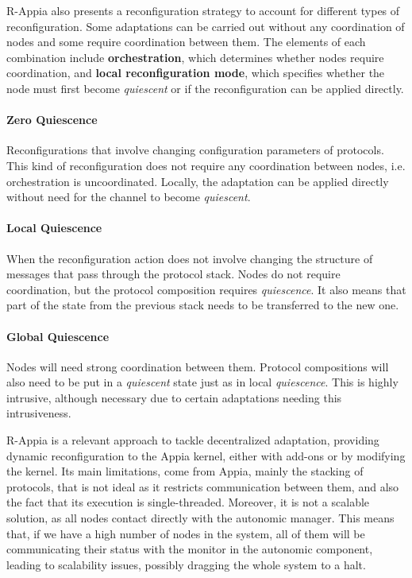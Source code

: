 R-Appia also presents a reconfiguration strategy to account for different types of reconfiguration. Some adaptations can be carried out  without any coordination of nodes and some require coordination between them. The elements of each combination include \textbf{orchestration}, which determines whether nodes require coordination, and \textbf{local reconfiguration mode}, which specifies whether the node must first become \textit{quiescent} or if the reconfiguration can be applied directly.

\paragraph{Zero Quiescence} Reconfigurations that involve changing configuration parameters of protocols. This kind of reconfiguration does not require any coordination between nodes, i.e. orchestration is uncoordinated. Locally, the adaptation can be applied directly without need for the channel to become \textit{quiescent}.

\paragraph{Local Quiescence} When the reconfiguration action does not involve changing the structure of messages that pass through the protocol stack. Nodes do not require coordination, but the protocol composition requires \textit{quiescence}. It also means that part of the state from the previous stack needs to be transferred to the new one.
\paragraph{Global Quiescence} Nodes will need strong coordination between them. Protocol compositions will also need to be put in a \textit{quiescent} state just as in local \textit{quiescence}. This is highly intrusive, although necessary due to certain adaptations needing this intrusiveness.

R-Appia is a relevant approach to tackle decentralized adaptation, providing dynamic reconfiguration to the Appia kernel, either with add-ons or by modifying the kernel. Its main limitations, come from Appia, mainly the stacking of protocols, that is not ideal as it restricts communication between them, and also the fact that its execution is single-threaded. Moreover, it is not a scalable solution, as all nodes contact directly with the autonomic manager. This means that, if we have a high number of nodes in the system, all of them will be communicating their status with the monitor in the autonomic component, leading to scalability issues, possibly dragging the whole system to a halt.
%
%
%
